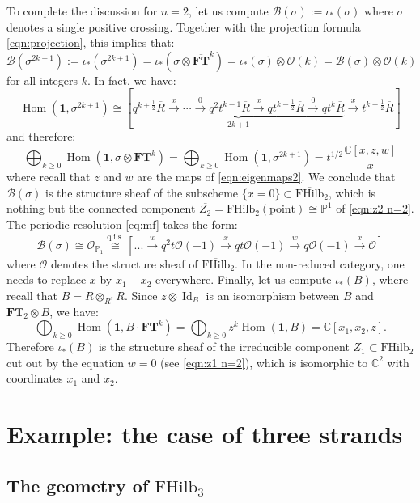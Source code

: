 \documentclass[12pt]{amsart}
\numberwithin{equation}{section}
\theoremstyle{definition}
\theoremstyle{remark}
\DeclareMathOperator{\Id}{Id}
\DeclareMathOperator{\Hom}{Hom}
\newcommand{\CC}{\mathbb{C}}
\newcommand{\PP}{\mathbb{P}}
\newcommand{\CB}{\mathcal{B}}
\newcommand{\CO}{\mathcal{O}}
\newcommand{\bFT}{\overline{\FT}}
\newcommand{\FT}{\mathbf{FT}}
\renewcommand{\1}{\mathbf{1}}
\newcommand{\FH}{\mathrm{FHilb}}
\newcommand{\qis}{\mathrm{q.i.s.}}
\newcommand{\point}{\mathrm{point}}
\newcommand{\bFH}{\overline{\FH}}
\newcommand{\Rred}{\overline{R}}
\begin{document}
To complete the discussion for $n=2$, let us compute $\CB(\sigma) := \iota_*(\sigma)$ where $\sigma$ denotes a single positive crossing. Together with the projection formula \eqref{eqn:projection}, this implies that:
$$
\CB(\sigma^{2k+1}) := \iota_*(\sigma^{2k+1}) = \iota_*(\sigma\otimes \bFT^k) = \iota_*(\sigma) \otimes \CO(k) = \CB(\sigma)\otimes \CO(k)
$$
for all integers $k$. In fact, we have:
$$
\Hom(\1,\sigma^{2k+1}) \cong \left[\underbrace{q^{k+\frac 12} \Rred \xrightarrow{x} \cdots \xrightarrow{0} q^{2} t^{k-1} \Rred \xrightarrow{x}  q t^{k-\frac 12} \Rred \xrightarrow{0} q t^{k} \Rred}_{2k+1} \xrightarrow{x}  t^{k+\frac 12} \Rred \right]  
$$
and therefore:
$$
\bigoplus_{k\ge 0}\Hom(\1, \sigma \otimes \FT^{k})=\bigoplus_{k\ge 0}\Hom(\1, \sigma^{2k+1})=t^{1/2}\frac{\CC[x,z,w]}{x}
$$
where recall that $z$ and $w$ are the maps of \eqref{eqn:eigenmaps2}. We conclude that $\CB(\sigma)$ is the structure sheaf of the subscheme $\{x=0\} \subset \bFH_2$, which is nothing but the connected component $\overline{Z_2} = \FH_2(\point) \cong \PP^1$ of \eqref{eqn:z2 n=2}. The periodic resolution \eqref{eq:mf} takes the form:
$$
\CB(\sigma) \cong \CO_{\PP_1} \stackrel{\qis} \cong \left[ ...  \stackrel{w}\longrightarrow q^2t \CO(-1) \stackrel{x}\rightarrow qt \CO(-1) \stackrel{w}\longrightarrow q \CO(-1) \stackrel{x}\rightarrow \CO\right]
$$
where $\CO$ denotes the structure sheaf of $\bFH_2$. In the non-reduced category, one needs to replace $x$ by $x_1-x_2$ everywhere. Finally, let us compute $\iota_*(B)$, where recall that $B = R \otimes_{R^s} R$. Since $z\otimes \Id_B$ is an isomorphism between $B$ and $\FT_2\otimes B$, we have:
$$
\bigoplus_{k\ge 0}\Hom(\1,B\cdot\FT^{k})=\bigoplus_{k\ge 0}z^k\Hom(\1,B)=\CC[x_1,x_2,z].
$$
Therefore $\iota_*(B)$ is the structure sheaf of the irreducible component $Z_1 \subset \FH_2$ cut out by the equation $w=0$ (see \eqref{eqn:z1 n=2}), which is isomorphic to $\CC^2$ with coordinates $x_1$ and $x_2$. 

\section{Example: the case of three strands}
\label{sec:n=3}

\subsection{The geometry of $\FH_3$}
\label{sub:fh 3}
\end{document}
